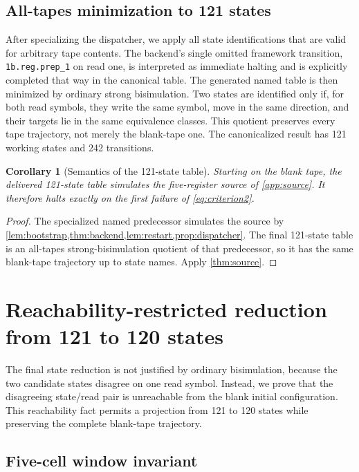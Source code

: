 \documentclass[10pt]{article}
\newtheorem{corollary}[theorem]{Corollary}
\theoremstyle{definition}
\begin{document}
\subsection{All-tapes minimization to 121 states}

After specializing the dispatcher, we apply all state identifications that are
valid for arbitrary tape contents.  The backend's single omitted framework
transition, \texttt{1b.reg.prep\_1} on read one, is interpreted as immediate
halting and is explicitly completed that way in the canonical table.  The
generated named table is then minimized by ordinary strong bisimulation. Two states are identified only if, for both read
symbols, they write the same symbol, move in the same direction, and their
targets lie in the same equivalence classes. This quotient preserves every
tape trajectory, not merely the blank-tape one. The canonicalized result has
121 working states and 242 transitions.

\begin{corollary}[Semantics of the 121-state table]
\label{cor:121semantics}
Starting on the blank tape, the delivered 121-state table simulates the
five-register source of \cref{app:source}.  It therefore halts exactly on the
first failure of \eqref{eq:criterion2}.
\end{corollary}

\begin{proof}
The specialized named predecessor simulates the source by
\cref{lem:bootstrap,thm:backend,lem:restart,prop:dispatcher}.  The final
121-state table is an all-tapes strong-bisimulation quotient of that
predecessor, so it has the same blank-tape trajectory up to state names.
Apply \cref{thm:source}.
\end{proof}

\section{Reachability-restricted reduction from 121 to 120 states}

The final state reduction is not justified by ordinary bisimulation, because
the two candidate states disagree on one read symbol. Instead, we prove that
the disagreeing state/read pair is unreachable from the blank initial
configuration. This reachability fact permits a projection from 121 to 120
states while preserving the complete blank-tape trajectory.

\subsection{Five-cell window invariant}
\end{document}
